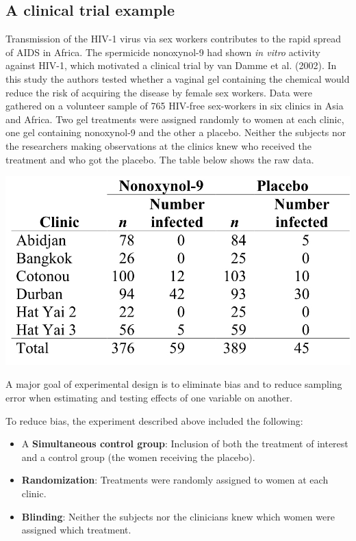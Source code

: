 \documentclass[]{book}
\providecommand{\tightlist}{%
  \setlength{\itemsep}{0pt}\setlength{\parskip}{0pt}}
\begin{document}
\hypertarget{a-clinical-trial-example}{%
\subsection{A clinical trial example}\label{a-clinical-trial-example}}

Transmission of the HIV-1 virus via sex workers contributes to the rapid spread of AIDS in Africa. The spermicide nonoxynol-9 had shown \emph{in vitro} activity against HIV-1, which motivated a clinical trial by van Damme et al. (2002). In this study the authors tested whether a vaginal gel containing the chemical would reduce the risk of acquiring the disease by female sex workers. Data were gathered on a volunteer sample of 765 HIV-free sex-workers in six clinics in Asia and Africa. Two gel treatments were assigned randomly to women at each clinic, one gel containing nonoxynol-9 and the other a placebo. Neither the subjects nor the researchers making observations at the clinics knew who received the treatment and who got the placebo. The table below shows the raw data.

\includegraphics[width=12.9in]{images/images_6a.005}

A major goal of experimental design is to eliminate bias and to reduce sampling error when estimating and testing effects of one variable on another.

To reduce bias, the experiment described above included the following:

\begin{itemize}
\tightlist
\item
  A \textbf{Simultaneous control group}: Inclusion of both the treatment of interest and a control group (the women receiving the placebo).
\item
  \textbf{Randomization}: Treatments were randomly assigned to women at each clinic.
\item
  \textbf{Blinding}: Neither the subjects nor the clinicians knew which women were assigned which treatment.
\end{itemize}
\end{document}
